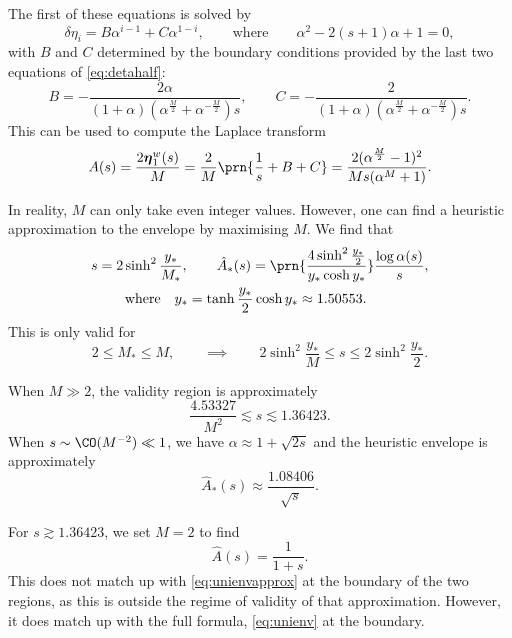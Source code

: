 \documentclass[12pt]{article}
\newcommand{\etw}{\boldsymbol{\eta}^w}
\begin{document}
The first of these equations is solved by
%
\begin{equation}\label{eq:detagensol}
  \delta\eta_i = B\alpha^{i-1} + C\alpha^{1-i},
  \qquad\text{where}\qquad
  \alpha^2 - 2(s+1)\alpha + 1 = 0,
\end{equation}
%
with $B$ and $C$ determined by the boundary conditions provided by the last two equations of \eqref{eq:detahalf}:
%
\begin{equation}\label{eq:unicoeffs}
  B = -\frac{2\alpha}{(1+\alpha)(\alpha^{\frac{M}{2}}+\alpha^{-\frac{M}{2}})s},
  \qquad
  C = -\frac{2}{(1+\alpha)(\alpha^{\frac{M}{2}}+\alpha^{-\frac{M}{2}})s}.
\end{equation}
%
This can be used to compute the Laplace transform
%
\begin{equation}\label{eq:unilaplace}
  A(s) = \frac{2\etw_1(s)}{M}
   = \frac{2}{M}\prn{\frac{1}{s}+B+C}
   = \frac{2(\alpha^{\frac{M}{2}}-1)^2}{Ms(\alpha^M+1)}.
\end{equation}
%

In reality, $M$ can only take even integer values.
However, one can find a heuristic approximation to the envelope by maximising \wrt $M$.
We find that
%
\begin{multline}\label{eq:unienv}
  s = 2\sinh^2\frac{y_*}{M_*},
  \qquad
  \hat{A}_*(s) = \prn{ \frac{ 4\sinh^2 \frac{y_*}{2} }{ y_* \cosh y_* } } \frac{\log\alpha(s)}{s},
  \\ \text{where}\quad
  y_* = \tanh \frac{y_*}{2} \cosh y_* \approx 1.50553.
  \qquad
\end{multline}
%
This is only valid for
%
\begin{equation}\label{eq:univalid}
  2 \leq M_* \leq M,
  \qquad\implies\qquad
  2\sinh^2 \frac{y_*}{M} \leq s \leq 2\sinh^2 \frac{y_*}{2}.
\end{equation}
%

When $M \gg 2$, the validity region is approximately
%
\begin{equation}\label{eq:univalidapprox}
  \frac{4.53327}{M^2} \lesssim s \lesssim 1.36423.
\end{equation}
%
When $s \sim \CO(M^{-2}) \ll 1$, we have $\alpha \approx 1+\sqrt{2s}$ and the heuristic envelope is approximately
%
\begin{equation}\label{eq:unienvapprox}
  \hat{A}_*(s) \approx \frac{ 1.08406 }{ \sqrt{s} }.
\end{equation}
%

For $s\gtrsim 1.36423$, we set $M=2$ to find
%
\begin{equation}\label{eq:binaryenv}
  \hat{A}(s) = \frac{1}{1+s}.
\end{equation}
%
This does not match up with \eqref{eq:unienvapprox} at the boundary of the two regions, as this is outside the regime of validity of that approximation.
However, it does match up with the full formula, \eqref{eq:unienv} at the boundary.
\end{document}
